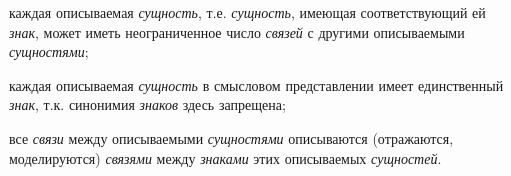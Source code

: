 \begin{SCn}
{{\begin{scnitemize}
	\item каждая описываемая \textit{сущность}, т.е. \textit{сущность}, имеющая соответствующий ей \textit{знак}, может иметь неограниченное число \textit{связей} с другими описываемыми \textit{сущностями};
	\item каждая описываемая \textit{сущность} в смысловом представлении имеет единственный \textit{знак}, т.к. синонимия \textit{знаков} здесь запрещена;
	\item все \textit{связи} между описываемыми \textit{сущностями} описываются (отражаются, моделируются) \textit{связями} между \textit{знаками} этих описываемых \textit{сущностей}.
\end{scnitemize}}
}



\end{SCn}
